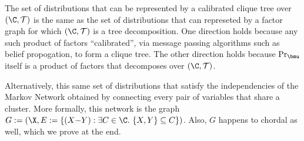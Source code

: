 \begin{lproof}\label{proof:can-use-cliquetree}
    
    The set of distributions that can be represented by a calibrated clique tree over $(\C,\cal T)$ is the same as the set of distributions that can represeted by a factor graph for which $(\C, \cal T)$ is a tree decomposition.
    One direction holds because any such product of factors ``calibrated'', via message passing algorithms such as belief propogation, to form a clique tree.
    The other direction holds because $\Pr_{\bmu}$ itself is a product of factors that decomposes over $(\C, \cal T)$. 

    
    
    Alternatively, this same set of distributions that satisfy the independencies of the Markov Network obtained by connecting every pair of variables that share a cluster.
    More formally, this network is the graph $G := (\X, E := \{ (X{-}Y) :  \exists C \in \C.~\{X,Y\} \subseteq C\})$. 
    Also, $G$ happens to chordal as well, which we prove at the end.
    

\end{lproof}
